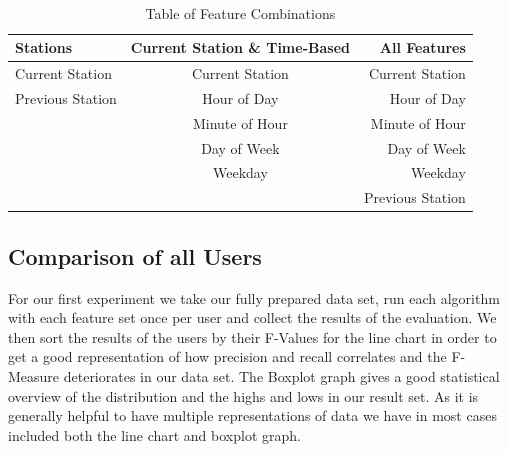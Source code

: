 \mbox{}\\
\begin{table}	
	\begin{center}
		\begin{tabular}{l | c | r}
			\hline
			\textbf{Stations} & \textbf{Current Station \& Time-Based} & \textbf{All Features} \\
			\hline
			 Current Station  & Current Station & Current Station \\
			 Previous Station & Hour of Day & Hour of Day \\
			  & Minute of Hour & Minute of Hour \\
			  & Day of Week & Day of Week \\
			  & Weekday & Weekday \\
			  & & Previous Station \\
			  \hline  
		\end{tabular}
	\end{center}
	\caption{Table of Feature Combinations}
	\label{table:feature_combinations}
\end{table}



\newpage
\subsection{Comparison of all Users}
For our first experiment we take our fully prepared data set, run each algorithm with each feature set once per user and collect the results of the evaluation. We then sort the results of the users by their F-Values for the line chart in order to get a good representation of how precision and recall correlates and the F-Measure deteriorates in our data set. The Boxplot graph gives a good statistical overview of the distribution and the highs and lows in our result set. As it is generally helpful to have multiple representations of data we have in most cases included both the line chart and boxplot graph.

